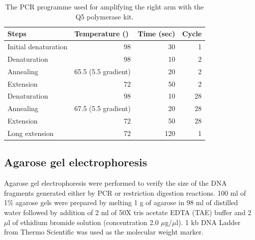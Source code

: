 		\begin{table}[htbp]
		\caption{The PCR programme used for amplifying the right arm with the Q5 polymerase kit.}
		\label{tab:rightpcr}
		\begin{center}
		\begin{tabular}{lrrr}
			\toprule[2pt]
			\textbf{Steps}       & \multicolumn{1}{l}{\textbf{Temperature (\textcelsius)}} & \multicolumn{1}{l}{\textbf{Time (sec)}} & \multicolumn{1}{l}{\textbf{Cycle}} \\ \midrule[1pt]
			Initial denaturation &                                                      98 &                                      30 &                                  1 \\
			Denaturation         &                                                      98 &                                      10 &                                  2 \\
			Annealing            &                                     65.5 (5.5 gradient) &                                      20 &                                  2 \\
			Extension            &                                                      72 &                                      50 &                                  2 \\
			Denaturation         &                                                      98 &                                      10 &                                 28 \\
			Annealing            &                                     67.5 (5.5 gradient) &                                      20 &                                 28 \\
			Extension            &                                                      72 &                                      50 &                                 28 \\
			Long extension       &                                                      72 &                                     120 &                                  1 \\ \bottomrule[2pt]
		\end{tabular}
		\end{center}
		\end{table}
		
		\subsection{Agarose gel electrophoresis}
		\label{sec:agarosegel}
		Agarose gel electrophoresis were performed to verify the size of the DNA fragments generated either by PCR or restriction digestion reactions. 100 ml of 1\% agarose gels were prepared by melting 1 g of agarose in 98 ml of distilled water followed by addition of 2 ml of 50X tris acetate EDTA (TAE) buffer and 2 $\mu$l of ethidium bromide solution (concentration 2.0 $\mu$g/$\mu$l). 1 kb DNA Ladder from Thermo Scientific was used as the molecular weight marker. 
		
